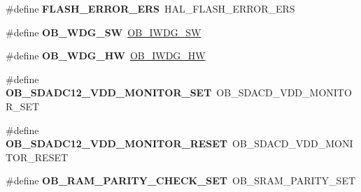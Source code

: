 \begin{DoxyCompactItemize}
\item 
\#define {\bfseries F\+L\+A\+S\+H\+\_\+\+E\+R\+R\+O\+R\+\_\+\+E\+RS}~H\+A\+L\+\_\+\+F\+L\+A\+S\+H\+\_\+\+E\+R\+R\+O\+R\+\_\+\+E\+RS\hypertarget{group___h_a_l___f_l_a_s_h___aliased___defines_gaf908de74b3e013ed30976d9e645354e2}{}\label{group___h_a_l___f_l_a_s_h___aliased___defines_gaf908de74b3e013ed30976d9e645354e2}

\item 
\#define {\bfseries O\+B\+\_\+\+W\+D\+G\+\_\+\+SW}~\hyperlink{group___f_l_a_s_h_ex___option___bytes___i_watchdog_ga5a357e232c955444c3f2ccb9a937ffce}{O\+B\+\_\+\+I\+W\+D\+G\+\_\+\+SW}\hypertarget{group___h_a_l___f_l_a_s_h___aliased___defines_gac332a5aa5da146e19f3c39067220f0f8}{}\label{group___h_a_l___f_l_a_s_h___aliased___defines_gac332a5aa5da146e19f3c39067220f0f8}

\item 
\#define {\bfseries O\+B\+\_\+\+W\+D\+G\+\_\+\+HW}~\hyperlink{group___f_l_a_s_h_ex___option___bytes___i_watchdog_gadfcbfa963d79c339ec8e2d5a7734e47a}{O\+B\+\_\+\+I\+W\+D\+G\+\_\+\+HW}\hypertarget{group___h_a_l___f_l_a_s_h___aliased___defines_gae9a94b5f21aaa5dd5558095fa684b5a3}{}\label{group___h_a_l___f_l_a_s_h___aliased___defines_gae9a94b5f21aaa5dd5558095fa684b5a3}

\item 
\#define {\bfseries O\+B\+\_\+\+S\+D\+A\+D\+C12\+\_\+\+V\+D\+D\+\_\+\+M\+O\+N\+I\+T\+O\+R\+\_\+\+S\+ET}~O\+B\+\_\+\+S\+D\+A\+C\+D\+\_\+\+V\+D\+D\+\_\+\+M\+O\+N\+I\+T\+O\+R\+\_\+\+S\+ET\hypertarget{group___h_a_l___f_l_a_s_h___aliased___defines_ga28d03f0c0e87570a3bc2faa4e720b8e3}{}\label{group___h_a_l___f_l_a_s_h___aliased___defines_ga28d03f0c0e87570a3bc2faa4e720b8e3}

\item 
\#define {\bfseries O\+B\+\_\+\+S\+D\+A\+D\+C12\+\_\+\+V\+D\+D\+\_\+\+M\+O\+N\+I\+T\+O\+R\+\_\+\+R\+E\+S\+ET}~O\+B\+\_\+\+S\+D\+A\+C\+D\+\_\+\+V\+D\+D\+\_\+\+M\+O\+N\+I\+T\+O\+R\+\_\+\+R\+E\+S\+ET\hypertarget{group___h_a_l___f_l_a_s_h___aliased___defines_ga330d35b134c5a576318103b718559b11}{}\label{group___h_a_l___f_l_a_s_h___aliased___defines_ga330d35b134c5a576318103b718559b11}

\item 
\#define {\bfseries O\+B\+\_\+\+R\+A\+M\+\_\+\+P\+A\+R\+I\+T\+Y\+\_\+\+C\+H\+E\+C\+K\+\_\+\+S\+ET}~O\+B\+\_\+\+S\+R\+A\+M\+\_\+\+P\+A\+R\+I\+T\+Y\+\_\+\+S\+ET\hypertarget{group___h_a_l___f_l_a_s_h___aliased___defines_ga98952cd374b07146bb79583fd61ef6e6}{}\label{group___h_a_l___f_l_a_s_h___aliased___defines_ga98952cd374b07146bb79583fd61ef6e6}


\end{DoxyCompactItemize}
